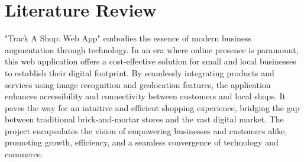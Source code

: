 \vspace{0.5cm}
\section{Literature Review}
"Track A Shop: Web App" embodies the essence of modern business augmentation through technology. In an era where online presence is paramount, this web application offers a cost-effective solution for small and local businesses to establish their digital footprint. By seamlessly integrating products and services using image recognition and geolocation features, the application enhances accessibility and connectivity between customers and local shops. It paves the way for an intuitive and efficient shopping experience, bridging the gap between traditional brick-and-mortar stores and the vast digital market. The project encapsulates the vision of empowering businesses and customers alike, promoting growth, efficiency, and a seamless convergence of technology and commerce.


